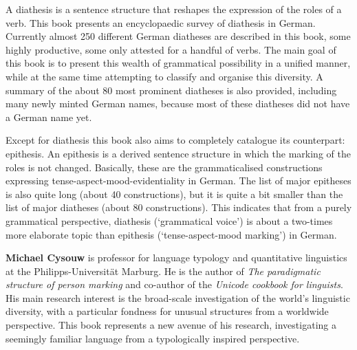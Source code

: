 A diathesis is a sentence structure that reshapes the expression of the roles of a verb. This book presents an encyclopaedic survey of diathesis in German. Currently almost 250 different German diatheses are described in this book, some highly productive, some only attested for a handful of verbs. The main goal of this book is to present this wealth of grammatical possibility in a unified manner, while at the same time attempting to classify and organise this diversity. A summary of the about 80 most prominent diatheses is also provided, including many newly minted German names, because most of these diatheses did not have a German name yet.

Except for diathesis this book also aims to completely catalogue its counterpart: epithesis. An epithesis is a derived sentence structure in which the marking of the roles is not changed. Basically, these are the grammaticalised constructions expressing tense-aspect-mood-evidentiality in German. The list of major epitheses is also quite long (about 40 constructions), but it is quite a bit smaller than the list of major diatheses (about 80 constructions). This indicates that from a purely grammatical perspective, diathesis (`grammatical voice') is about a two-times more elaborate topic than epithesis (`tense-aspect-mood marking') in German.

\vspace{1\baselineskip}

\noindent\textbf{Michael Cysouw} is professor for language typology and quantitative linguistics at the Philipps-Universität Marburg. He is the author of \textit{The paradigmatic structure of person marking} and co-author of the \textit{Unicode cookbook for linguists}. His main research interest is the broad-scale investigation of the world's linguistic diversity, with a particular fondness for unusual structures from a worldwide perspective. This book represents a new avenue of his research, investigating a seemingly familiar language from a typologically inspired perspective.
